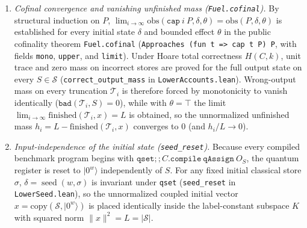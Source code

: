 \documentclass[11pt,a4paper]{article}
\theoremstyle{definition}
\theoremstyle{remark}
\begin{document}
\begin{enumerate}
\item \emph{Cofinal convergence and vanishing unfinished mass (\texttt{Fuel.cofinal}).} By structural induction on \(P\), \(\lim_{i \to \infty} \mathrm{obs}(\texttt{cap}\ i\ P, \delta, \theta) = \mathrm{obs}(P, \delta, \theta)\) is established for every initial state \(\delta\) and bounded effect \(\theta\) in the public cofinality theorem \texttt{Fuel.cofinal} (\texttt{Approaches (fun t => cap t P) P}, with fields \texttt{mono}, \texttt{upper}, and \texttt{limit}). Under Hoare total correctness \(H(C,k)\), unit trace and zero mass on incorrect stores are proved for the full output state on every \(S \in \mathcal{S}\) (\texttt{correct\_\allowbreak output\_\allowbreak mass} in \texttt{LowerAccounts.lean}). Wrong-output mass on every truncation \(\mathcal{T}_i\) is therefore forced by monotonicity to vanish identically (\(\texttt{bad}(\mathcal{T}_i, S) = 0\)), while with \(\theta = \top\) the limit \(\lim_{i \to \infty} \mathrm{finished}(\mathcal{T}_i, x) = L\) is obtained, so the unnormalized unfinished mass \(h_i = L - \mathrm{finished}(\mathcal{T}_i, x)\) converges to \(0\) (and \(h_i / L \to 0\)).
\item \emph{Input-independence of the initial state (\texttt{seed\_reset}).} Because every compiled benchmark program begins with \(\texttt{qset}\mathbin{;;} C.\texttt{compile}\ \texttt{qAssign}\ O_S\), the quantum register is reset to \(|0^w\rangle\) independently of \(S\). For any fixed initial classical store \(\sigma\), \(\delta = \operatorname{seed}(w,\sigma)\) is invariant under \texttt{qset} (\texttt{seed\_reset} in \texttt{LowerSeed.lean}), so the unnormalized coupled initial vector \(x = \mathrm{copy}(\mathcal{S}, |0^w\rangle)\) is placed identically inside the label-constant subspace \(K\) with squared norm \(\|x\|^2 = L = |\mathcal{S}|\).

\end{enumerate}
\end{document}
